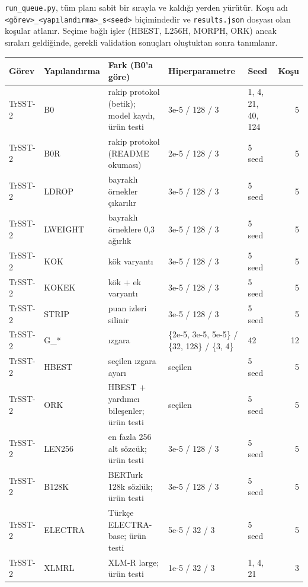 \documentclass[11pt]{article}
\begin{document}
\texttt{run\_\allowbreak{}\allowbreak{}queue.\allowbreak{}\allowbreak{}py}, tüm planı sabit bir sırayla ve kaldığı yerden yürütür. Koşu adı \texttt{<görev>\_\allowbreak{}\allowbreak{}<yapılandırma>\_\allowbreak{}\allowbreak{}s<seed>} biçimindedir ve \texttt{results.\allowbreak{}\allowbreak{}json} dosyası olan koşular atlanır. Seçime bağlı işler (HBEST, L256H, MORPH, ORK) ancak sıraları geldiğinde, gerekli validation sonuçları oluştuktan sonra tanımlanır.

\begin{table}[!htbp]
\centering
\scriptsize
\setlength{\tabcolsep}{4pt}
\begin{tabularx}{\textwidth}{ll>{\raggedright\arraybackslash}Xllr}
\toprule
Görev & Yapılandırma & Fark (B0'a göre) & Hiperparametre & Seed & Koşu \\
\midrule
TrSST-2 & B0 & rakip protokol (betik); model kaydı, ürün testi & 3e-5 / 128 / 3 & 1, 4, 21, 40, 124 & \mbox{5} \\
TrSST-2 & B0R & rakip protokol (README okuması) & 2e-5 / 128 / 3 & 5 seed & \mbox{5} \\
TrSST-2 & LDROP & bayraklı örnekler çıkarılır & 3e-5 / 128 / 3 & 5 seed & \mbox{5} \\
TrSST-2 & LWEIGHT & bayraklı örneklere 0,3 ağırlık & 3e-5 / 128 / 3 & 5 seed & \mbox{5} \\
TrSST-2 & KOK & kök varyantı & 3e-5 / 128 / 3 & 5 seed & \mbox{5} \\
TrSST-2 & KOKEK & kök + ek varyantı & 3e-5 / 128 / 3 & 5 seed & \mbox{5} \\
TrSST-2 & STRIP & puan izleri silinir & 3e-5 / 128 / 3 & 5 seed & \mbox{5} \\
TrSST-2 & G\_* & ızgara & \{2e-5, 3e-5, 5e-5\} / \{32, 128\} / \{3, 4\} & 42 & \mbox{12} \\
TrSST-2 & HBEST & seçilen ızgara ayarı & seçilen & 5 seed & \mbox{5} \\
TrSST-2 & ORK & HBEST + yardımcı bileşenler; ürün testi & seçilen & 5 seed & \mbox{5} \\
TrSST-2 & LEN256 & en fazla 256 alt sözcük; ürün testi & 3e-5 / 128 / 3 & 5 seed & \mbox{5} \\
TrSST-2 & B128K & BERTurk 128k sözlük; ürün testi & 3e-5 / 128 / 3 & 5 seed & \mbox{5} \\
TrSST-2 & ELECTRA & Türkçe ELECTRA-base; ürün testi & 5e-5 / 32 / 3 & 5 seed & \mbox{5} \\
TrSST-2 & XLMRL & XLM-R large; ürün testi & 1e-5 / 32 / 3 & 1, 4, 21 & \mbox{3} \\

\end{tabularx}
\end{table}
\end{document}
